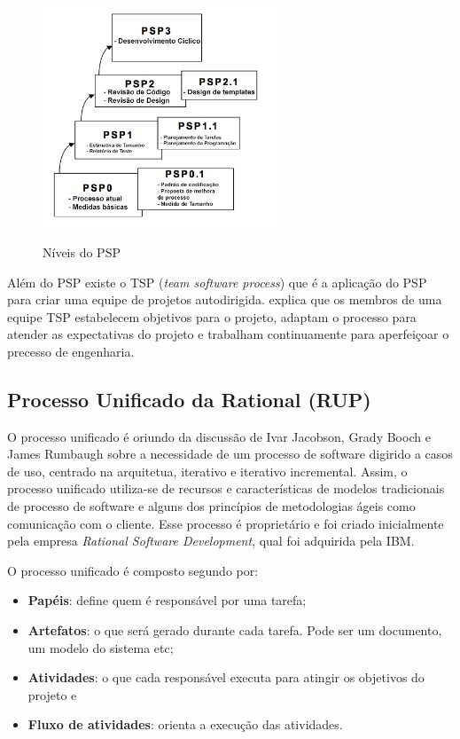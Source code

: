\begin{figure}[htb!]
\begin{center}
\caption{Níveis do PSP}
\label{fig:09}
\includegraphics[width=7cm]{assets/psp-nivel} \\
\end{center}
\end{figure}

Além do PSP existe o TSP (\textit{team software process}) que é a aplicação do PSP para criar uma equipe de projetos autodirigida.  explica que os membros de uma equipe TSP estabelecem objetivos para o projeto, adaptam o processo para atender as expectativas do projeto e trabalham continuamente para aperfeiçoar o precesso de engenharia.

\subsection{Processo Unificado da Rational (RUP)}
\label{sec:rup}

O processo unificado é oriundo da discussão de Ivar Jacobson, Grady Booch e James Rumbaugh sobre a necessidade de um processo de software digirido a casos de uso, centrado na arquitetua, iterativo e iterativo incremental. Assim, o processo unificado utiliza-se de recursos e características de modelos tradicionais de processo de software e alguns dos princípios de metodologias ágeis como comunicação com o cliente. Esse processo é proprietário e foi criado inicialmente pela empresa \textit{Rational Software Development}, qual foi adquirida pela IBM. \cite{pressman:11} \cite{machado:13}

O processo unificado é composto segundo  por:

\begin{itemize}
	\item \textbf{Papéis}: define quem é responsável por uma tarefa;
	\item \textbf{Artefatos}: o que será gerado durante cada tarefa. Pode ser um documento, um modelo do sistema etc;
	\item \textbf{Atividades}: o que cada responsável executa para atingir os objetivos do projeto e
	\item \textbf{Fluxo de atividades}: orienta a execução das atividades.
\end{itemize}

